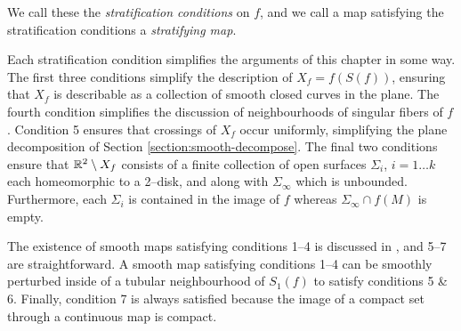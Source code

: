 We call these the \emph{stratification conditions} on $f$, and we call a map satisfying the stratification conditions a \emph{stratifying map}.

Each stratification condition simplifies the arguments of this chapter in some way.
The first three conditions simplify the description of $X_f=f(S(f))$, ensuring that $X_f$ is describable as a collection of smooth closed curves in the plane.
The fourth condition simplifies the discussion of neighbourhoods of singular fibers of $f$.
Condition 5 ensures that crossings of $X_f$ occur uniformly, simplifying the plane decomposition of Section \ref{section:smooth-decompose}.
The final two conditions ensure that $\mathbb{R}^2\setminus X_f$ consists of a finite collection of open surfaces $\Sigma_i$, $i=1\dots k$ each homeomorphic to a 2--disk, and along with $\Sigma_\infty$ which is unbounded.
Furthermore, each $\Sigma_i$ is contained in the image of $f$ whereas $\Sigma_\infty\cap f(M)$ is empty.

The existence of smooth maps satisfying conditions 1--4 is discussed in \cite{Levine65}, and 5--7 are straightforward.
A smooth map satisfying conditions 1--4 can be smoothly perturbed inside of a tubular neighbourhood of $S_1(f)$ to satisfy conditions 5 \& 6.
Finally, condition 7 is always satisfied because the image of a compact set through a continuous map is compact.


